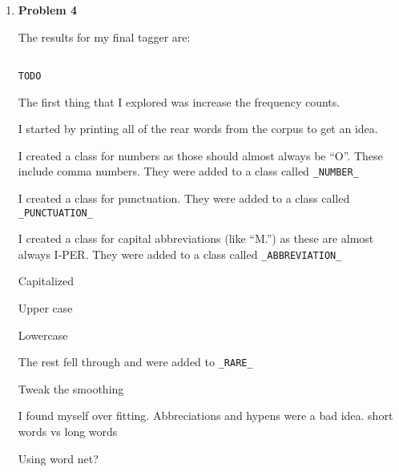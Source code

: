\documentclass[10pt]{article}
\begin{document}
\begin{enumerate}
\newpage

\item {\bf Problem 4}

The results for my final tagger are:

\begin{verbatim}

TODO

\end{verbatim}


The first thing that I explored was increase the frequency counts.

I started by printing all of the rear words from the corpus to get an idea.



I created a class for numbers as those should almost always be ``O''. These include comma numbers. They were added to a class called {\tt \_NUMBER\_}

I created a class for punctuation. They were added to a class called {\tt \_PUNCTUATION\_}

I created a class for capital abbreviations (like ``M.'') as these are almost always I-PER. They were added to a class called {\tt \_ABBREVIATION\_}

Capitalized

Upper case 

Lowercase

The rest fell through and were added to {\tt \_RARE\_}

Tweak the smoothing

I found myself over fitting. Abbreciations and hypens were a bad idea. short words vs long words

Using word net?

\end{enumerate}
\end{document}
